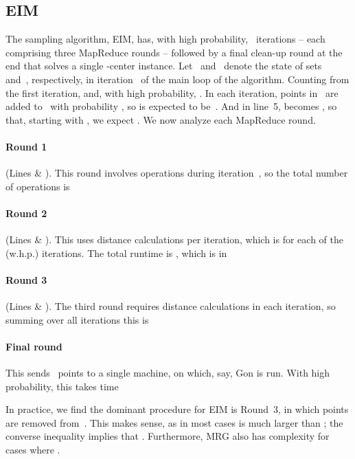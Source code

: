 \documentclass[11pt]{article}
\newcommand{\ours}{{\sc MRG}\xspace}
\newcommand{\ene}{{\sc EIM}\xspace}
\newcommand{\gon}{{\sc Gon}\xspace}
\begin{document}
\subsection{\ene}
The sampling algorithm, \ene, has, with high probability,~
iterations -- each comprising
three MapReduce rounds --
followed by a final clean-up round at the end that solves a single -center
instance. 
Let~  and~ denote the state of sets~ and~,
respectively, in iteration~ of the main loop of the algorithm.
Counting from the first iteration,  and, with high probability, .
In each iteration, points in~ are added to~ with probability
, so  is expected to be~.
And in line~5,  becomes , so that,
starting with , we expect 
.
We now analyze each MapReduce round.

\vspace{2mm}
\paragraph*{Round 1}
(Lines  \& ). 
This round involves  operations during iteration~,
so the total number of operations is
\vspace{-2mm}

\vspace{-6mm}

\paragraph*{Round 2}
(Lines  \& ). 
This uses  distance calculations per iteration,
which is 
for each of
the~ (w.h.p.) iterations.
The total runtime is , which is in

\vspace{-10mm}

\paragraph*{Round 3}
(Lines  \& ). 
The third round requires  distance calculations in each
iteration, so summing over all iterations this is
\vspace{-2mm}
\vspace{-6mm}


\paragraph*{Final round}
 This sends~ points to a single machine,
on which, say,  \gon is run.
With high probability,
this takes time 


In practice, we find the dominant procedure for \ene is Round~3, in which points are
removed from~.
This makes sense, as in most cases  is much larger than
; the converse inequality implies that .
Furthermore, \ours also has  complexity for cases where .
\end{document}
